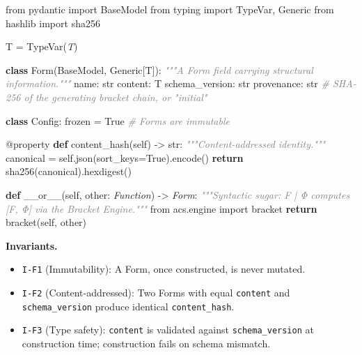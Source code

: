 \documentclass[11pt,a4paper]{article}
\newenvironment{Shaded}{\begin{snugshade}\small}{\end{snugshade}}
\newcommand{\ImportTok}[1]{#1}
\newcommand{\KeywordTok}[1]{\textbf{#1}}
\newcommand{\StringTok}[1]{\textit{#1}}
\newcommand{\CommentTok}[1]{\textit{\textcolor{gray}{#1}}}
\newcommand{\FunctionTok}[1]{#1}
\newcommand{\VariableTok}[1]{#1}
\newcommand{\ControlFlowTok}[1]{\textbf{#1}}
\newcommand{\OperatorTok}[1]{#1}
\newcommand{\BuiltInTok}[1]{#1}
\newcommand{\AttributeTok}[1]{#1}
\newcommand{\NormalTok}[1]{#1}
\providecommand{\tightlist}{\setlength{\itemsep}{0pt}\setlength{\parskip}{0pt}}
\begin{document}
\begin{Shaded}
\begin{Highlighting}[]
\ImportTok{from}\NormalTok{ pydantic }\ImportTok{import}\NormalTok{ BaseModel}
\ImportTok{from}\NormalTok{ typing }\ImportTok{import}\NormalTok{ TypeVar, Generic}
\ImportTok{from}\NormalTok{ hashlib }\ImportTok{import}\NormalTok{ sha256}

\NormalTok{T }\OperatorTok{=}\NormalTok{ TypeVar(}\StringTok{\textquotesingle{}T\textquotesingle{}}\NormalTok{)}

\KeywordTok{class}\NormalTok{ Form(BaseModel, Generic[T]):}
    \CommentTok{"""A Form field carrying structural information."""}
\NormalTok{    name: }\BuiltInTok{str}
\NormalTok{    content: T}
\NormalTok{    schema\_version: }\BuiltInTok{str}
\NormalTok{    provenance: }\BuiltInTok{str}  \CommentTok{\# SHA{-}256 of the generating bracket chain, or "initial"}

    \KeywordTok{class}\NormalTok{ Config:}
\NormalTok{        frozen }\OperatorTok{=} \VariableTok{True}  \CommentTok{\# Forms are immutable}

    \AttributeTok{@property}
    \KeywordTok{def}\NormalTok{ content\_hash(}\VariableTok{self}\NormalTok{) }\OperatorTok{{-}\textgreater{}} \BuiltInTok{str}\NormalTok{:}
        \CommentTok{"""Content{-}addressed identity."""}
\NormalTok{        canonical }\OperatorTok{=} \VariableTok{self}\NormalTok{.json(sort\_keys}\OperatorTok{=}\VariableTok{True}\NormalTok{).encode()}
        \ControlFlowTok{return}\NormalTok{ sha256(canonical).hexdigest()}

    \KeywordTok{def} \FunctionTok{\_\_or\_\_}\NormalTok{(}\VariableTok{self}\NormalTok{, other: }\StringTok{\textquotesingle{}Function\textquotesingle{}}\NormalTok{) }\OperatorTok{{-}\textgreater{}} \StringTok{\textquotesingle{}Form\textquotesingle{}}\NormalTok{:}
        \CommentTok{"""Syntactic sugar: F | Φ computes [F, Φ] via the Bracket Engine."""}
        \ImportTok{from}\NormalTok{ acs.engine }\ImportTok{import}\NormalTok{ bracket}
        \ControlFlowTok{return}\NormalTok{ bracket(}\VariableTok{self}\NormalTok{, other)}
\end{Highlighting}
\end{Shaded}

\textbf{Invariants.}

\begin{itemize}
\tightlist
\item
  \texttt{I-F1} (Immutability): A Form, once constructed, is never
  mutated.
\item
  \texttt{I-F2} (Content-addressed): Two Forms with equal
  \texttt{content} and \texttt{schema\_version} produce identical
  \texttt{content\_hash}.
\item
  \texttt{I-F3} (Type safety): \texttt{content} is validated against
  \texttt{schema\_version} at construction time; construction fails on
  schema mismatch.
\end{itemize}
\end{document}
